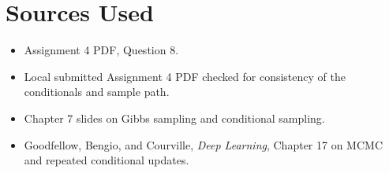 \documentclass[11pt]{article}
\begin{document}
\section*{Sources Used}

\begin{itemize}
    \item Assignment 4 PDF, Question 8.
    \item Local submitted Assignment 4 PDF checked for consistency of the conditionals and sample path.
    \item Chapter 7 slides on Gibbs sampling and conditional sampling.
    \item Goodfellow, Bengio, and Courville, \emph{Deep Learning}, Chapter 17 on MCMC and repeated conditional updates.
\end{itemize}
\end{document}
